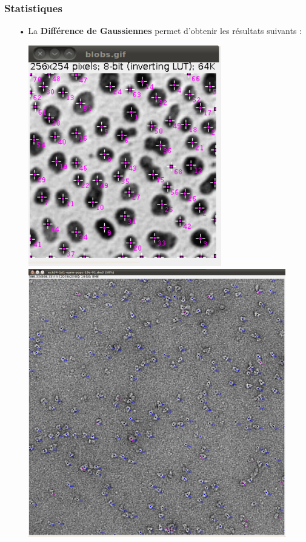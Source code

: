 \subsubsection*{Statistiques}

\begin{itemize}
\item[•] La \textbf{Différence de Gaussiennes} permet d'obtenir les résultats suivants :
\end{itemize}

\begin{figure}[!ht]
\begin{center}
 \begin{minipage}{.450\linewidth}
  \includegraphics[width=0.75\textwidth]{blobsDog.png}  
 \end{minipage} \hfill
\begin{minipage}{.450\linewidth}
  \includegraphics[width=1\textwidth]{protDog.png}   

\end{minipage}
\end{center}
\end{figure}
